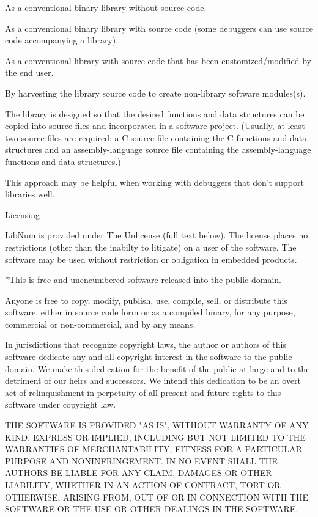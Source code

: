 As a conventional binary library without source code.

As a conventional binary library with source code (some debuggers can
use source code accompanying a library).

As a conventional library with source code that has been
customized/modified by the end user.

By harvesting the library source code to create non-library software
modules(s).

The library is designed so that the desired functions and data structures
can be copied into source files and incorporated in a software project.
(Usually, at least two source files are required: a C source file
containing the C functions and data structures and an assembly-language
source file containing the assembly-language functions and data structures.)

This approach may be helpful when working with debuggers that don't
support libraries well.

Licensing

LibNum is provided under The Unlicense (full text below). The license
places no restrictions (other than the inabilty to litigate) on a
user of the software. The software may be used without restriction
or obligation in embedded products.

*This is free and unencumbered software released into the public domain.

Anyone is free to copy, modify, publish, use, compile, sell, or
distribute this software, either in source code form or as a compiled
binary, for any purpose, commercial or non-commercial, and by any
means.

In jurisdictions that recognize copyright laws, the author or authors
of this software dedicate any and all copyright interest in the
software to the public domain. We make this dedication for the benefit
of the public at large and to the detriment of our heirs and
successors. We intend this dedication to be an overt act of
relinquishment in perpetuity of all present and future rights to this
software under copyright law.

THE SOFTWARE IS PROVIDED "AS IS", WITHOUT WARRANTY OF ANY KIND,
EXPRESS OR IMPLIED, INCLUDING BUT NOT LIMITED TO THE WARRANTIES OF
MERCHANTABILITY, FITNESS FOR A PARTICULAR PURPOSE AND NONINFRINGEMENT.
IN NO EVENT SHALL THE AUTHORS BE LIABLE FOR ANY CLAIM, DAMAGES OR
OTHER LIABILITY, WHETHER IN AN ACTION OF CONTRACT, TORT OR OTHERWISE,
ARISING FROM, OUT OF OR IN CONNECTION WITH THE SOFTWARE OR THE USE OR
OTHER DEALINGS IN THE SOFTWARE.

